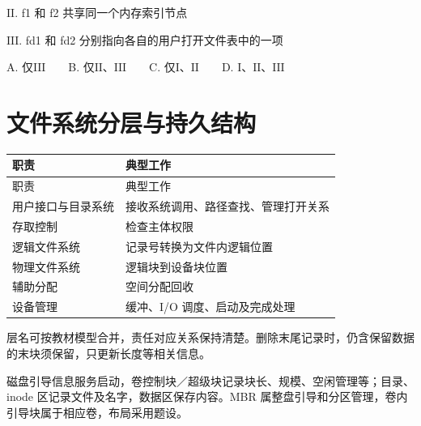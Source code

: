 \ensuremath{\mathrm{II}}. f1 和 f2 共享同一个内存索引节点

\ensuremath{\mathrm{III}}. fd1 和 fd2 分别指向各自的用户打开文件表中的一项

A. 仅\ensuremath{\mathrm{III}}　　B. 仅\ensuremath{\mathrm{II}}、\ensuremath{\mathrm{III}}　　C. 仅\ensuremath{\mathrm{I}}、\ensuremath{\mathrm{II}}　　D. \ensuremath{\mathrm{I}}、\ensuremath{\mathrm{II}}、\ensuremath{\mathrm{III}}

\section{文件系统分层与持久结构}\label{OS04-fs-structures}

\par\smallskip
{\fontsize{9.3}{12}\selectfont\setlength{\tabcolsep}{2.5pt}\setlength{\LTleft}{0pt}\setlength{\LTright}{0pt}
\begin{longtable}{@{}>{\raggedright\arraybackslash}p{}>{\raggedright\arraybackslash}p{}@{}}
\toprule
职责 & 典型工作 \\

\midrule\endfirsthead\toprule
职责 & 典型工作 \\

\midrule\endhead\bottomrule\endfoot
用户接口与目录系统 & 接收系统调用、路径查找、管理打开关系 \\

存取控制 & 检查主体权限 \\

逻辑文件系统 & 记录号转换为文件内逻辑位置 \\

物理文件系统 & 逻辑块到设备块位置 \\

辅助分配 & 空间分配回收 \\

设备管理 & 缓冲、I/O 调度、启动及完成处理 \\

\end{longtable}}
\par\smallskip

层名可按教材模型合并，责任对应关系保持清楚。删除末尾记录时，仍含保留数据的末块须保留，只更新长度等相关信息。

磁盘引导信息服务启动，卷控制块／超级块记录块长、规模、空闲管理等；目录、inode 区记录文件及名字，数据区保存内容。MBR 属整盘引导和分区管理，卷内引导块属于相应卷，布局采用题设。

